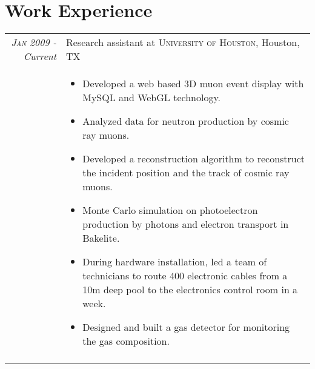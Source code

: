 \documentclass[11pt]{article} %
\begin{document}
\section{Work Experience}

\begin{tabular}{r|p{12cm}}
\emph{\textsc{Jan 2009} - Current} & Research assistant at \textsc{University of Houston}, Houston, TX \\
& \small
\begin{itemize}
  \item Developed a web based 3D muon event display with MySQL and WebGL technology.
  \item	Analyzed data for neutron production by cosmic ray muons.
  \item Developed a reconstruction algorithm to reconstruct the incident position and the track of cosmic ray muons.
  \item Monte Carlo simulation on photoelectron production by photons and electron transport in Bakelite.
  \item During hardware installation, led a team of technicians to route 400 electronic cables from a 10m deep pool to the electronics control room in a week.
  \item Designed and built a gas detector for monitoring the gas composition.
\end{itemize}\\
\multicolumn{2}{c}{} \\
\end{tabular}\newpage
\end{document}
